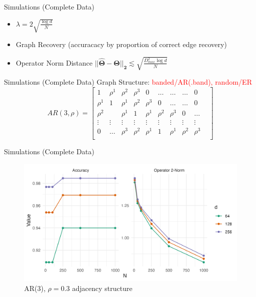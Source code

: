 \documentclass{beamer}
\begin{document}
\begin{frame}{Simulations (Complete Data)}
    \begin{itemize}\setlength\itemsep{6mm}
        \item $\lambda = 2\sqrt{\frac{\log d}{N}}$
        \item Graph Recovery (accuracacy by proportion of correct edge recovery)
        \item Operator Norm Distance $\mathbf{||\hat\Theta - \Theta||_2} \lesssim \sqrt{\frac{D_{max}^2\log d}{N}}$ 
    \end{itemize}
\end{frame}

\begin{frame}{Simulations (Complete Data)}
    Graph Structure: \newline 
    \textcolor{red}{banded/AR(.band), random/ER } \\ 
    \[
    AR(3, \rho) = \begin{bmatrix}
        1 & \rho^1 & \rho^2 & \rho^3 &  0 & \dots & \dots & \dots & 0 \\
        \rho^1 & 1 & \rho^1 & \rho^2 & \rho^3 &  0 & \dots & \dots & 0 \\
        \rho^2 & & \rho^1 & 1 & \rho^1 & \rho^2 & \rho^3 & 0 & \dots\\
        \vdots &\vdots &\vdots &\vdots &\vdots &\vdots &\vdots &\vdots &\vdots &\\
        0 & \dots & \rho^3 & \rho^2 & \rho^1 & 1 & \rho^1 & \rho^2 & \rho^3 \\ 
    \end{bmatrix}
    \]
\end{frame}


\begin{frame}{Simulations (Complete Data)}
    \begin{figure}
        \centering 
        \includegraphics[scale=0.65]{glasso_complete_fixN_b3.png}
        \caption{AR(3), $\rho=0.3$ adjacency structure}
    \end{figure}
\end{frame}
\end{document}
